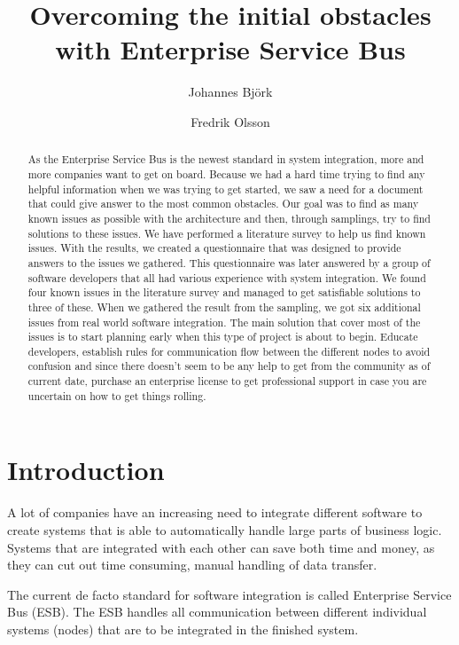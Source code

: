 \documentclass{llncs}
\title{Overcoming the initial obstacles with Enterprise Service Bus}
\author{Johannes Björk \inst{1} \and Fredrik Olsson \inst{1}}
\institute{
	Blekinge Institute of Technology \\
	\email{johannes@johannesbjork.se}, \email{spooky.bender@gmail.com}
}
\begin{document}
\maketitle

\begin{abstract}
As the Enterprise Service Bus is the newest standard in system integration, more and more companies want to get on board. 
Because we had a hard time trying to find any helpful information when we was trying to get started, we saw a need for a document that could give answer to the most common obstacles. 
Our goal was to find as many known issues as possible with the architecture and then, through samplings, try to find solutions to these issues. 
We have performed a literature survey to help us find known issues. With the results, we created a questionnaire that was designed to provide answers to the issues we gathered. This questionnaire was later answered by a group of software developers that all had various experience with system integration. 
We found four known issues in the literature survey and managed to get satisfiable solutions to three of these. When we gathered the result from the sampling, we got six additional issues from real world software integration.
The main solution that cover most of the issues is to start planning early when this type of project is about to begin. Educate developers, establish rules for communication flow between the different nodes to avoid confusion and since there doesn't seem to be any help to get from the community as of current date, purchase an enterprise license to get professional support in case you are uncertain on how to get things rolling. 

\end{abstract}

\newpage
\setcounter{tocdepth}{3}
\newpage

\section{Introduction}
A lot of companies have an increasing need to integrate different software to create systems that is able to automatically handle large parts of business logic. Systems that are integrated with each other can save both time and money, as they can cut out time consuming, manual handling of data transfer.

The current de facto standard for software integration is called Enterprise Service Bus (ESB). The ESB handles all communication between different individual systems (nodes) that are to be integrated in the finished system.
\end{document}
